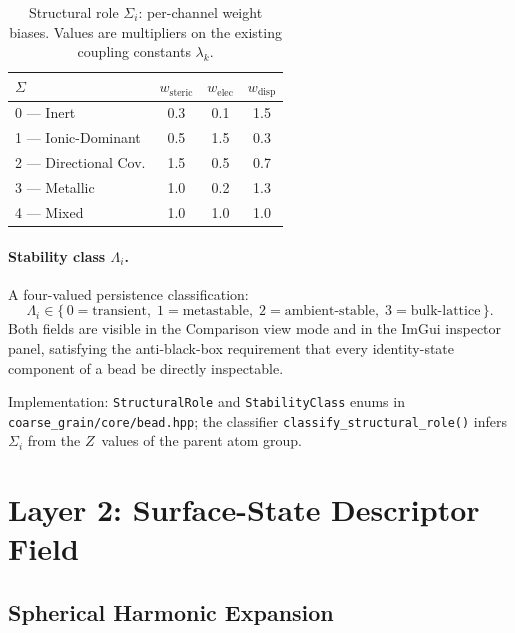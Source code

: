 \documentclass[12pt, a4paper, oneside]{article}
\newcommand{\file}[1]{\texttt{#1}}
\newcommand{\type}[1]{\texttt{#1}}
\begin{document}
\begin{table}[htbp]
  \centering
  \caption{Structural role $\Sigma_i$: per-channel weight biases.
           Values are multipliers on the existing coupling constants
           $\lambda_k$.}
  \label{tab:role-weights}
  \begin{tabular}{lccc}
    \toprule
    $\Sigma$ & $w_{\text{steric}}$ & $w_{\text{elec}}$ & $w_{\text{disp}}$ \\
    \midrule
    0 — Inert              & 0.3 & 0.1 & 1.5 \\
    1 — Ionic-Dominant     & 0.5 & 1.5 & 0.3 \\
    2 — Directional Cov.   & 1.5 & 0.5 & 0.7 \\
    3 — Metallic           & 1.0 & 0.2 & 1.3 \\
    4 — Mixed              & 1.0 & 1.0 & 1.0 \\
    \bottomrule
  \end{tabular}
\end{table}

\paragraph{Stability class $\Lambda_i$.}
A four-valued persistence classification:
\[
  \Lambda_i \in
  \bigl\{\,
    0\!=\!\text{transient},\;
    1\!=\!\text{metastable},\;
    2\!=\!\text{ambient-stable},\;
    3\!=\!\text{bulk-lattice}
  \,\bigr\}.
\]
Both fields are visible in the Comparison view mode and in the ImGui
inspector panel, satisfying the anti-black-box requirement that every
identity-state component of a bead be directly inspectable.

Implementation: \type{StructuralRole} and \type{StabilityClass} enums
in \file{coarse\_grain/core/bead.hpp}; the classifier
\texttt{classify\_structural\_role()} infers $\Sigma_i$ from the
$Z$~values of the parent atom group.

\section{Layer 2: Surface-State Descriptor Field}
\label{sec:layer2}

\subsection{Spherical Harmonic Expansion}
\end{document}
